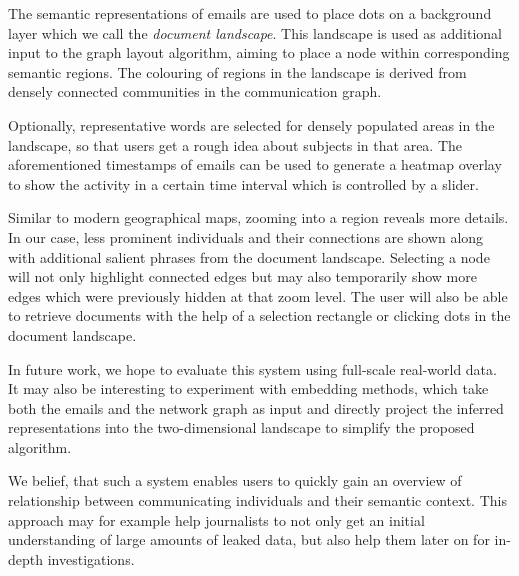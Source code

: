 The semantic representations of emails are used to place dots on a background layer which we call the \textit{document landscape}.
This landscape is used as additional input to the graph layout algorithm, aiming to place a node within corresponding semantic regions.
The colouring of regions in the landscape is derived from densely connected communities in the communication graph.

Optionally, representative words are selected for densely populated areas in the landscape, so that users get a rough idea about subjects in that area.
The aforementioned timestamps of emails can be used to generate a heatmap overlay to show the activity in a certain time interval which is controlled by a slider.

Similar to modern geographical maps, zooming into a region reveals more details.
In our case, less prominent individuals and their connections are shown along with additional salient phrases from the document landscape.
Selecting a node will not only highlight connected edges but may also temporarily show more edges which were previously hidden at that zoom level.
The user will also be able to retrieve documents with the help of a selection rectangle or clicking dots in the document landscape.

In future work, we hope to evaluate this system using full-scale real-world data.
It may also be interesting to experiment with embedding methods, which take both the emails and the network graph as input and directly project the inferred representations into the two-dimensional landscape to simplify the proposed algorithm.

We belief, that such a system enables users to quickly gain an overview of relationship between communicating individuals and their semantic context.
This approach may for example help journalists to not only get an initial understanding of large amounts of leaked data, but also help them later on for in-depth investigations.

